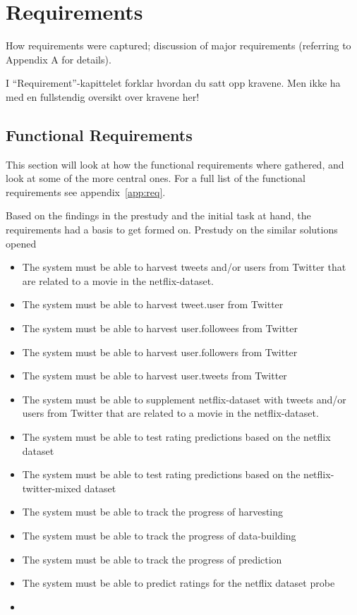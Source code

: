 
\chapter{Requirements}

\minitoc

How requirements  were  captured;
  discussion  of  major requirements
(referring  to  Appendix  A for details).

I “Requirement”-kapittelet forklar hvordan du satt opp kravene.
Men ikke ha med en fullstendig oversikt over kravene her!


\clearpage

\section{Functional Requirements}\label{section:functional-requirements}
This section will look at how the functional requirements where gathered, and look at some of the more central ones. For a full list of the functional requirements see appendix~\ref{app:req}.

Based on the findings in the prestudy and the initial task at hand, the requirements had a basis to get formed on. Prestudy on the similar solutions opened

\begin{itemize}
  \item The system must be able to harvest tweets and/or users from Twitter that are related to a movie in the netflix-dataset.
  \item The system must be able to harvest tweet.user from Twitter
  \item The system must be able to harvest user.followees from Twitter
  \item The system must be able to harvest user.followers from Twitter
  \item The system must be able to harvest user.tweets from Twitter

  \item The system must be able to supplement netflix-dataset with tweets and/or users from Twitter that are related to a movie in the netflix-dataset.
  \item The system must be able to test rating predictions based on the netflix dataset
  \item The system must be able to test rating predictions based on the netflix-twitter-mixed dataset
  \item The system must be able to track the progress of harvesting
  \item The system must be able to track the progress of data-building
  \item The system must be able to track the progress of prediction
  \item The system must be able to predict ratings for the netflix dataset probe
  \item
\end{itemize}

